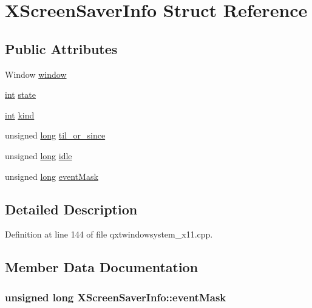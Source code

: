 \hypertarget{struct_x_screen_saver_info}{\section{X\-Screen\-Saver\-Info Struct Reference}
\label{struct_x_screen_saver_info}
}
\subsection*{Public Attributes}
\begin{DoxyCompactItemize}
\item 
Window \hyperlink{struct_x_screen_saver_info_aae6cf8c68819ef4899f8d2117552875a}{window}
\item 
\hyperlink{ioapi_8h_a787fa3cf048117ba7123753c1e74fcd6}{int} \hyperlink{struct_x_screen_saver_info_a8b78e02613ac59472df6347d6946b71c}{state}
\item 
\hyperlink{ioapi_8h_a787fa3cf048117ba7123753c1e74fcd6}{int} \hyperlink{struct_x_screen_saver_info_a64a6cdb4051ae07c1374ef5ac30cc2c2}{kind}
\item 
unsigned \hyperlink{ioapi_8h_a3c7b35ad9dab18b8310343c201f7b27e}{long} \hyperlink{struct_x_screen_saver_info_aca1addbda62ae2224a8cb99e683ec8fa}{til\-\_\-or\-\_\-since}
\item 
unsigned \hyperlink{ioapi_8h_a3c7b35ad9dab18b8310343c201f7b27e}{long} \hyperlink{struct_x_screen_saver_info_a94dbc84476b56e465fbabad5be227182}{idle}
\item 
unsigned \hyperlink{ioapi_8h_a3c7b35ad9dab18b8310343c201f7b27e}{long} \hyperlink{struct_x_screen_saver_info_a5cb083c317ca0f1a19aee7798f2938a2}{event\-Mask}
\end{DoxyCompactItemize}


\subsection{Detailed Description}


Definition at line 144 of file qxtwindowsystem\-\_\-x11.\-cpp.



\subsection{Member Data Documentation}
\hypertarget{struct_x_screen_saver_info_a5cb083c317ca0f1a19aee7798f2938a2}{
\subsubsection[{event\-Mask}]{\setlength{\rightskip}{0pt plus 5cm}unsigned {\bf long} X\-Screen\-Saver\-Info\-::event\-Mask}}\label{struct_x_screen_saver_info_a5cb083c317ca0f1a19aee7798f2938a2}


